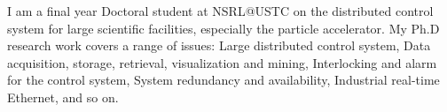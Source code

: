 

I am a final year Doctoral student at NSRL@USTC on the distributed control system for large scientific facilities, especially the particle accelerator. My Ph.D research work covers a range of issues: Large distributed control system, Data acquisition, storage, retrieval,  visualization and mining, Interlocking and alarm for the control system, System redundancy and availability, Industrial real-time Ethernet, and so on. \\


